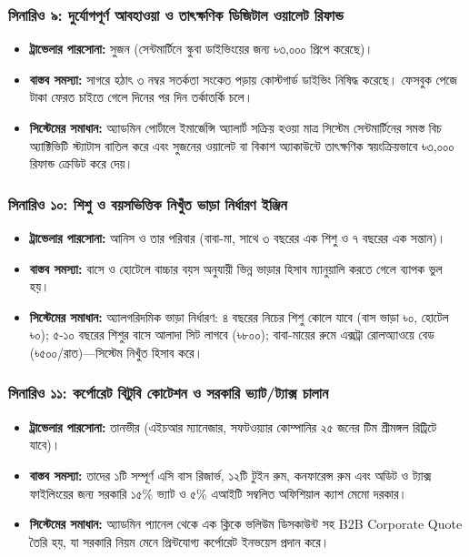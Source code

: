 \documentclass[11pt,a4paper]{article}
\begin{document}
\subsubsection{সিনারিও ৯: দুর্যোগপূর্ণ আবহাওয়া ও তাৎক্ষণিক ডিজিটাল ওয়ালেট রিফান্ড}
\begin{itemize}[leftmargin=*]
    \item \textbf{ট্রাভেলার পারসোনা:} সুজন (সেন্টমার্টিনে স্কুবা ডাইভিংয়ের জন্য ৳৩,০০০ প্রিপে করেছে)।
    \item \textbf{বাস্তব সমস্যা:} সাগরে হঠাৎ ৩ নম্বর সতর্কতা সংকেত পড়ায় কোস্টগার্ড ডাইভিং নিষিদ্ধ করেছে। ফেসবুক পেজে টাকা ফেরত চাইতে গেলে দিনের পর দিন তর্কাতর্কি চলে।
    \item \textbf{সিস্টেমের সমাধান:} অ্যাডমিন পোর্টালে ইমার্জেন্সি অ্যালার্ট সক্রিয় হওয়া মাত্র সিস্টেম সেন্টমার্টিনের সমস্ত বিচ অ্যাক্টিভিটি স্ট্যাটাস বাতিল করে এবং সুজনের ওয়ালেট বা বিকাশ অ্যাকাউন্টে তাৎক্ষণিক স্বয়ংক্রিয়ভাবে ৳৩,০০০ রিফান্ড ক্রেডিট করে দেয়।
\end{itemize}

\subsubsection{সিনারিও ১০: শিশু ও বয়সভিত্তিক নিখুঁত ভাড়া নির্ধারণ ইঞ্জিন}
\begin{itemize}[leftmargin=*]
    \item \textbf{ট্রাভেলার পারসোনা:} আনিস ও তার পরিবার (বাবা-মা, সাথে ৩ বছরের এক শিশু ও ৭ বছরের এক সন্তান)।
    \item \textbf{বাস্তব সমস্যা:} বাসে ও হোটেলে বাচ্চার বয়স অনুযায়ী ভিন্ন ভাড়ার হিসাব ম্যানুয়ালি করতে গেলে ব্যাপক ভুল হয়।
    \item \textbf{সিস্টেমের সমাধান:} অ্যালগরিদমিক ভাড়া নির্ধারণ: ৪ বছরের নিচের শিশু কোলে যাবে (বাস ভাড়া ৳০, হোটেল ৳০); ৫-১০ বছরের শিশুর বাসে আলাদা সিট লাগবে (৳৮০০); বাবা-মায়ের রুমে এক্সট্রা রোলঅ্যাওয়ে বেড (৳৫০০/রাত)—সিস্টেম নিখুঁত হিসাব করে।
\end{itemize}

\subsubsection{সিনারিও ১১: কর্পোরেট বিটুবি কোটেশন ও সরকারি ভ্যাট/ট্যাক্স চালান}
\begin{itemize}[leftmargin=*]
    \item \textbf{ট্রাভেলার পারসোনা:} তানভীর (এইচআর ম্যানেজার, সফটওয়্যার কোম্পানির ২৫ জনের টিম শ্রীমঙ্গল রিট্রিটে যাবে)।
    \item \textbf{বাস্তব সমস্যা:} তাদের ১টি সম্পূর্ণ এসি বাস রিজার্ভ, ১২টি টুইন রুম, কনফারেন্স রুম এবং অডিট ও ট্যাক্স ফাইলিংয়ের জন্য সরকারি ১৫\% ভ্যাট ও ৫\% এআইটি সম্বলিত অফিশিয়াল ক্যাশ মেমো দরকার।
    \item \textbf{সিস্টেমের সমাধান:} অ্যাডমিন প্যানেল থেকে এক ক্লিকে ভলিউম ডিসকাউন্ট সহ B2B Corporate Quote তৈরি হয়, যা সরকারি নিয়ম মেনে প্রিন্টযোগ্য কর্পোরেট ইনভয়েস প্রদান করে।
\end{itemize}
\end{document}
